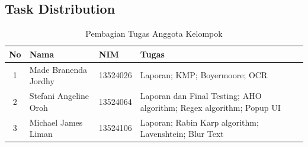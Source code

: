 \documentclass[11pt,a4paper]{article}
\begin{document}
\subsection*{Task Distribution}
\begin{table}[H]
\centering
\caption{Pembagian Tugas Anggota Kelompok}
\label{tab:pembagian-tugas}
\renewcommand{\arraystretch}{1.5}
\begin{tabular}{|c|p{3.5cm}|p{2.5cm}|p{5cm}|}
\hline
\textbf{No} & \textbf{Nama} & \textbf{NIM} & \textbf{Tugas} \\
\hline
1 & Made Branenda Jordhy & 13524026 &  Laporan; KMP; Boyermoore; OCR\\
\hline
2 & Stefani Angeline Oroh & 13524064 & Laporan dan Final Testing; AHO algorithm; Regex algorithm; Popup UI \\
\hline
3 & Michael James Liman & 13524106 & Laporan; Rabin Karp algorithm; Lavenshtein; Blur Text\\
\hline
\end{tabular}
\end{table}
\end{document}
